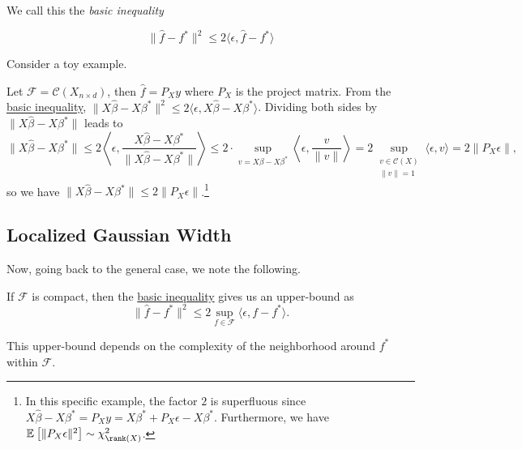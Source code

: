 We call this the \emph{basic inequality}

\begin{equation}\label{eq:basic-inequality}
	\lVert \hat{f} - f^{\ast}  \rVert ^2 \leq 2 \langle \epsilon , \hat{f} - f^{\ast} \rangle
\end{equation}

Consider a toy example.

\begin{eg}
	Let \(\mathscr{F} = \mathcal{C} (X_{n\times d})\), then \(\hat{f} = P_X y\) where \(P_X\) is the project matrix. From the \hyperref[eq:basic-inequality]{basic inequality}, \(\lVert X \hat{\beta} - X \beta ^{\ast}  \rVert ^2 \leq 2 \langle \epsilon , X \hat{\beta} - X \beta ^{\ast} \rangle\). Dividing both sides by \(\lVert X \hat{\beta} - X \beta ^{\ast} \rVert \) leads to
	\[
		\lVert X \hat{\beta} - X \beta ^{\ast} \rVert \leq 2 \left\langle \epsilon , \frac{X \hat{\beta} - X \beta ^{\ast}}{\lVert X \hat{\beta} - X \beta ^{\ast} \rVert } \right\rangle
		\leq 2\cdot \sup _{v = X \beta - X \beta ^{\ast} } \left\langle \epsilon , \frac{v}{\lVert v \rVert } \right\rangle
		= 2 \sup _{\substack{v\in \mathcal{C} (X) \\ \lVert v \rVert = 1}} \langle \epsilon , v \rangle
		= 2 \lVert P_X \epsilon  \rVert,
	\]
	so we have \(\lVert X \hat{\beta} - X \beta ^{\ast} \rVert \leq 2 \lVert P_X \epsilon \rVert \).\footnote{In this specific example, the factor \(2\) is superfluous since \(X \hat{\beta} - X \beta ^{\ast} = P_X y = X \beta ^{\ast} + P_X \epsilon - X \beta ^{\ast} \). Furthermore, we have \(\mathbb{E}_{}\left[ \lVert P_X \epsilon \rVert ^2 \right] \sim \chi ^2_{\rank (X)}\).}
\end{eg}

\subsection{Localized Gaussian Width}
Now, going back to the general case, we note the following.

\begin{note}
	If \(\mathscr{F} \) is compact, then the \hyperref[eq:basic-inequality]{basic inequality} gives us an upper-bound as
	\[
		\lVert \hat{f} - f^{\ast} \rVert ^2 \leq 2 \sup _{f\in \mathscr{F} } \langle \epsilon , f - f^{\ast} \rangle.
	\]
\end{note}

\begin{intuition}
	This upper-bound depends on the complexity of the neighborhood around \(f^{\ast} \) within \(\mathscr{F} \).
\end{intuition}

